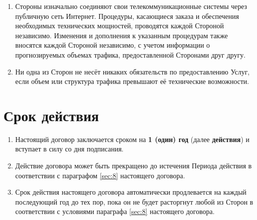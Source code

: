 \begin{Form}
\begin{enumerate}[label=\thesection.\arabic*.]
     \item Стороны  изначально соединяют свои телекоммуникационные системы через публичную сеть Интернет.
          Процедуры, касающиеся заказа и обеспечения необходимых технических мощностей,
          проводятся каждой Стороной независимо. Изменения и дополнения к указанным процедурам
          также вносятся каждой Стороной независимо, с учетом информации о прогнозируемых объемах трафика,
          предоставленной Сторонами друг другу.
      \item Ни одна из Сторон не несёт никаких обязательств по предоставлению Услуг, если объем или структура
           трафика превышают её технические возможности.
   \end{enumerate}

   \section{Срок действия}\label{sec:3}
    \begin{enumerate}[label=\thesection.\arabic*.]
     \item  Настоящий договор заключается сроком на \textbf{1 (один) год} (далее \textbf{ действия\frqq})
              и вступает в силу со дня подписания.
      \item Действие договора может быть прекращено до истечения Периода действия в соответствии с параграфом \ref{sec:8} настоящего договора.
      \item Срок действия настоящего договора автоматически продлевается на каждый последующий год
            до тех пор, пока он не будет расторгнут любой из Сторон в соответствии с условиями параграфа \ref{sec:8} настоящего договора.
    \end{enumerate}

\end{Form}
